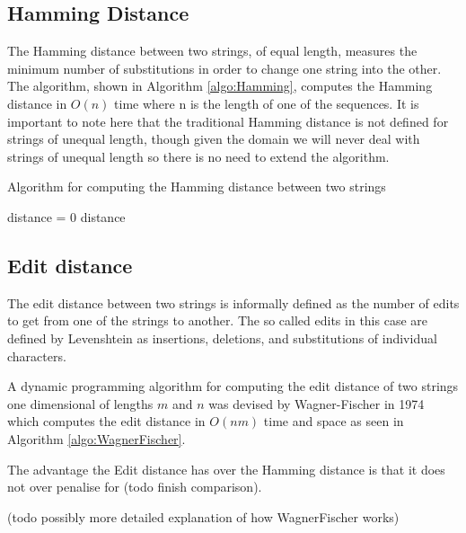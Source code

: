 \documentclass[12pt,twoside,notitlepage]{report}
\begin{document}
	\subsection{Hamming Distance}
		The Hamming distance\cite{Hamming1950} between two strings, of equal length, measures the minimum number of substitutions in order to change one string into the other. The algorithm, shown in Algorithm \ref{algo:Hamming}, computes the Hamming distance in $O(n)$ time where n is the length of one of the sequences. It is important to note here that the traditional Hamming distance is not defined for strings of unequal length, though given the domain we will never deal with strings of unequal length so there is no need to extend the algorithm.
		\begin{algorithm}
			\caption{Algorithm for computing the Hamming distance between two strings}
			\label{algo:Hamming}
			\begin{algorithmic}[1]
				\State distance = 0
					\EndIf
				\EndFor
				\State \Return distance
			\EndProcedure
			\end{algorithmic}
		\end{algorithm}
		
		
 		\subsection{Edit distance}
		The edit distance between two strings is informally defined as the number of edits to get from one of the strings to another. The so called edits in this case are defined by Levenshtein\cite{Levenshtein1966} as insertions, deletions, and substitutions of individual characters. 
		
		A dynamic programming algorithm for computing the edit distance of two strings one dimensional of lengths $m$ and $n$ was devised by Wagner-Fischer in 1974\cite{WagnerFischer1974} which computes the edit distance in $O(nm)$ time and space as seen in Algorithm \ref{algo:WagnerFischer}. 
		
		The advantage the Edit distance has over the Hamming distance is that it does not over penalise for (todo finish comparison).
		
		(todo possibly more detailed explanation of how WagnerFischer works)
		
\end{document}

